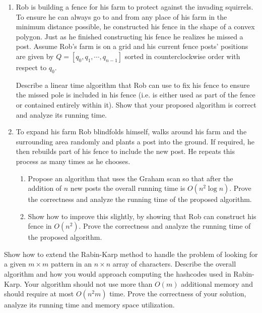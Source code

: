 \documentclass{common/cs157}
\begin{document}
\homeworkhandin

\begin{problem}{1}
\begin{enumerate}
    \item Rob is building a fence for his farm to protect against the invading squirrels. To ensure he can always go to and from any place of his farm in the minimum distance possible, he constructed his fence in the shape of a convex polygon. Just as he finished constructing his fence he realizes he missed a post. Assume Rob's farm is on a grid and his current fence posts' positions are given by $Q = [q_0, q_1, \cdots, q_{n - 1}]$ sorted in counterclockwise order with respect to $q_0$. 
    
    Describe a linear time algorithm that Rob can use to fix his fence to ensure the missed pole is included in his fence (i.e. is either used as part of the fence or contained entirely within it). Show that your proposed algorithm is correct and analyze its running time.
    
    \item To expand his farm Rob blindfolds himself, walks around his farm and the surrounding area randomly and plants a post into the ground. If required, he then rebuilds part of his fence to include the new post. He repeats this process as many times as he chooses.
    \begin{enumerate}
        \item Propose an algorithm that uses the Graham scan so that after the addition of $n$ new posts the overall running time is $O(n^2\log n)$. Prove the correctness and analyze the running time of the proposed algorithm.
        \item Show how to improve this slightly, by showing that Rob can construct his fence in $O(n^2)$. Prove the correctness and analyze the running time of the proposed algorithm.
    \end{enumerate}
\end{enumerate}
\end{problem}

\newpage

\begin{problem}{2}
Show how to extend the Rabin-Karp method to handle the problem of looking for a given $m\times m$ pattern in an $n\times n$ array of characters. Describe the overall algorithm and how you would approach computing the hashcodes used in Rabin-Karp. Your algorithm should not use more than $O(m)$ additional memory and should require at most $O(n^2m)$ time. Prove the correctness of your solution, analyze its running time and memory space utilization.
\end{problem}
\end{document}
